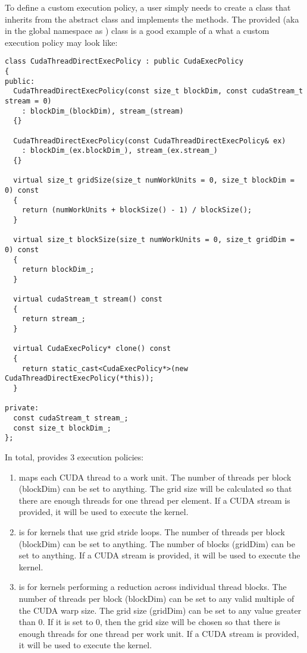To define a custom execution policy, a user simply needs to create a class that inherits from
the abstract class and implements the methods. The {\sundials} provided
 (aka in the global namespace as
) class is a good example of a what a custom execution policy
may look like:

\begin{verbatim}
class CudaThreadDirectExecPolicy : public CudaExecPolicy
{
public:
  CudaThreadDirectExecPolicy(const size_t blockDim, const cudaStream_t stream = 0)
    : blockDim_(blockDim), stream_(stream)
  {}

  CudaThreadDirectExecPolicy(const CudaThreadDirectExecPolicy& ex)
    : blockDim_(ex.blockDim_), stream_(ex.stream_)
  {}

  virtual size_t gridSize(size_t numWorkUnits = 0, size_t blockDim = 0) const
  {
    return (numWorkUnits + blockSize() - 1) / blockSize();
  }

  virtual size_t blockSize(size_t numWorkUnits = 0, size_t gridDim = 0) const
  {
    return blockDim_;
  }

  virtual cudaStream_t stream() const
  {
    return stream_;
  }

  virtual CudaExecPolicy* clone() const
  {
    return static_cast<CudaExecPolicy*>(new CudaThreadDirectExecPolicy(*this));
  }

private:
  const cudaStream_t stream_;
  const size_t blockDim_;
};
\end{verbatim}

In total, {\sundials} provides 3 execution policies:

\begin{enumerate}
  \item {}
    maps each CUDA thread to a work unit. The number of threads per block (blockDim) can be set
    to anything. The grid size will be calculated so that there are enough threads for one
    thread per element. If a CUDA stream is provided, it will be used to execute the kernel.

  \item {}
    is for kernels that use grid stride loops. The number of threads per block (blockDim)
    can be set to anything. The number of blocks (gridDim) can be set to anything. If a
    CUDA stream is provided, it will be used to execute the kernel.

  \item {}
    is for kernels performing a reduction across individual thread blocks. The number of threads
    per block (blockDim) can be set to any valid multiple of the CUDA warp size. The grid size
    (gridDim) can be set to any value greater than 0. If it is set to 0, then the grid size
    will be chosen so that there is enough threads for one thread per work unit. If a
    CUDA stream is provided, it will be used to execute the kernel.
\end{enumerate}

